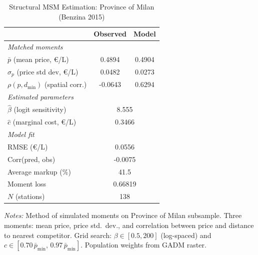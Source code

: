 \begin{table}[htbp]
\centering
\caption{Structural MSM Estimation: Province of Milan (Benzina 2015)}
\label{tab:msm_milan}
\begin{tabular}{lcc}
\hline\hline
& Observed & Model \\
\hline
\multicolumn{3}{l}{\textit{Matched moments}} \\[2pt]
$\bar{p}$ (mean price, \euro/L)          & 0.4894 & 0.4904 \\
$\sigma_p$ (price std dev, \euro/L)      & 0.0482 & 0.0273 \\
$\rho(p, d_{\min})$ (spatial corr.)      & -0.0643 & 0.6294 \\
\hline
\multicolumn{3}{l}{\textit{Estimated parameters}} \\[2pt]
$\hat{\beta}$ (logit sensitivity)  & \multicolumn{2}{c}{8.555} \\
$\hat{c}$ (marginal cost, \euro/L) & \multicolumn{2}{c}{0.3466} \\
\hline
\multicolumn{3}{l}{\textit{Model fit}} \\[2pt]
RMSE (\euro/L)              & \multicolumn{2}{c}{0.0556} \\
Corr(pred, obs)             & \multicolumn{2}{c}{-0.0075} \\
Average markup (\%)         & \multicolumn{2}{c}{41.5} \\
Moment loss                 & \multicolumn{2}{c}{0.66819} \\
$N$ (stations)              & \multicolumn{2}{c}{138} \\
\hline\hline
\end{tabular}
\begin{tablenotes}
\small
\item \textit{Notes:} Method of simulated moments on Province of Milan subsample.
Three moments: mean price, price std.\ dev., and correlation between price and distance
to nearest competitor. Grid search: $\beta\in[0.5,200]$ (log-spaced) and
$c\in[0.70\,\bar{p}_{\min},\,0.97\,\bar{p}_{\min}]$. Population weights from GADM raster.
\end{tablenotes}
\end{table}
